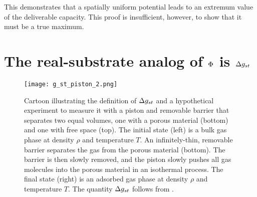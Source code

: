 This demonstrates that a spatially uniform potential leads to an extremum value
of the deliverable capacity. This proof is insufficient, however, to show that
it must be a true maximum.

\section{The real-substrate analog of $\Phi$ is $\Delta g_{st}$}
\label{sec:phi-is-delta-g}
\begin{figure}
    \centering
    \texttt{[image: g\_st\_piston\_2.png]}
    \caption{Cartoon illustrating the definition of $\Delta g_{st}$ and a
      hypothetical experiment to measure it with a piston and
      removable barrier that separates two equal volumes, one with a
      porous material (bottom) and one with free space (top). The
      initial state (left) is a bulk gas phase at density $\rho$ and
      temperature $T$. An infinitely-thin, removable barrier separates
      the gas from the porous material (bottom). The barrier is then
      slowly removed, and the piston slowly pushes all gas molecules
      into the porous material in an isothermal process. The final
      state (right) is an adsorbed gas phase at density $\rho$ and
      temperature $T$. The quantity $\Delta g_{st}$ follows from .}
    \label{fig:delta-G-cartoon}
\end{figure}

